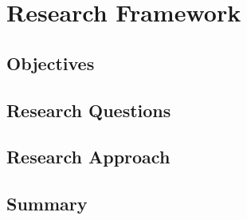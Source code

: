 \chapter{Research Framework\label{cha:method}}

\section{Objectives}

\section{Research Questions}

\section{Research Approach}

\section{Summary}